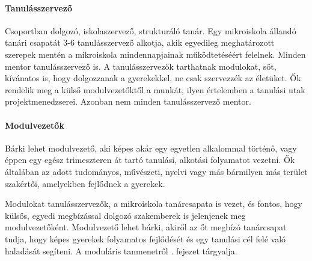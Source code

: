   \paragraph{Tanulásszervező}
  Csoportban dolgozó, iskolaszervező, strukturáló tanár. Egy mikroiskola állandó tanári
  csapatát 3-6 tanulásszervező alkotja, akik egyedileg meghatározott szerepek mentén a mikroiskola mindennapjainak működtetéséért felelnek. Minden mentor tanulásszervező is. A tanulásszervezők tarthatnak
  modulokat, sőt, kívánatos is, hogy dolgozzanak a gyerekekkel, ne csak szervezzék az életüket.
  Ők rendelik meg a külső modulvezetőktől a munkát, ilyen értelemben a
  tanulási utak projektmenedzserei. Azonban nem minden tanulásszervező mentor.

  \paragraph{Modulvezetők}

  Bárki lehet modulvezető, aki képes akár egy egyetlen alkalommal történő, vagy éppen
  egy egész trimeszteren át tartó tanulási, alkotási folyamatot vezetni. Ők általában
  az adott tudományos, művészeti, nyelvi vagy más bármilyen más terület szakértői, amelyekben fejlődnek a gyerekek.

  Modulokat tanulásszervezők, a mikroiskola tanárcsapata is vezet, és fontos, hogy külsős, egyedi megbízással dolgozó szakemberek is jelenjenek meg modulvezetőként. Modulvezető lehet bárki, akiről az őt megbízó tanárcsapat tudja, hogy képes gyerekek folyamatos fejlődését és egy tanulási cél felé való haladását segíteni. A moduláris tanmenetről . fejezet tárgyalja.
